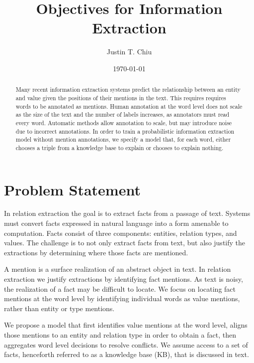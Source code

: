\documentclass[12pt]{article}
\title{Objectives for Information Extraction}
\author{
Justin T. Chiu
}
\date{\today}
\begin{document}
\maketitle

\begin{abstract}
Many recent information extraction systems predict the relationship between
an entity and value given the positions of their mentions in the text.
This requires requires words to be annotated as mentions.
Human annotation at the word level does not scale as the size of the text
and the number of labels increases, as annotators must read every word.
Automatic methods allow annotation to scale, but may introduce noise due to incorrect annotations.
In order to train a probabilistic information extraction model without mention
annotations, we specify a model that, for each word,
either chooses a triple from a knowledge base to explain or chooses to explain nothing.
\end{abstract}

\section{Problem Statement}

In relation extraction the goal is to extract facts from a passage of text.
Systems must convert facts expressed in natural language into a form
amenable to computation.
Facts consist of three components: entities, relation types, and values.
The challenge is to not only extract facts from text, but also
justify the extractions by determining where those facts are mentioned.

A mention is a surface realization of an abstract object in text.
In relation extraction we justify extractions by identifying fact mentions.
As text is noisy, the realization of a fact may be difficult to locate.
We focus on locating fact mentions at the word level by identifying
individual words as value mentions, rather than entity or type mentions.

We propose a model that first identifies value mentions at the word level,
aligns those mentions to an entity and relation type in order to obtain a fact, 
then aggregates word level decisions to resolve conflicts.
We assume access to a set of facts, henceforth referred to as a knowledge base (KB),
that is discussed in text.

\begin{comment}
Note on related work:
Except for \citet{zeng2018copy}, prior work has either assumed that the locations of
entities and values are given as input features or that the locations of entities and values
are observed at training time.
\end{comment}
\end{document}
